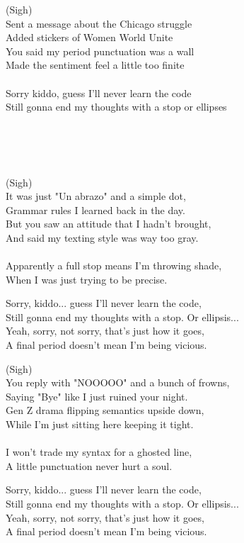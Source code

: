\begin{lyrics}


(Sigh)
\\
Sent a message about the Chicago struggle\\
Added stickers of Women World Unite\\
You said my period punctuation was a wall\\
Made the sentiment feel a little too finite\\
\\
Sorry kiddo, guess I'll never learn the code\\
Still gonna end my thoughts with a stop or ellipses

\\
\\
\\

(Sigh)
\\
It was just "Un abrazo" and a simple dot,\\
Grammar rules I learned back in the day.\\
But you saw an attitude that I hadn’t brought,\\
And said my texting style was way too gray.\\
\\
Apparently a full stop means I'm throwing shade,\\
When I was just trying to be precise.

Sorry, kiddo... %
guess I'll never learn the code,\\
Still gonna end my thoughts with a stop. %
Or ellipsis...\\
Yeah, sorry, not sorry, that's just how it goes,\\
A final period doesn't mean I'm being vicious.

(Sigh)
\\
You reply with "NOOOOO" and a bunch of frowns,\\
Saying "Bye" like I just ruined your night.\\
Gen Z drama flipping semantics upside down,\\
While I'm just sitting here keeping it tight.\\
\\
I won't trade my syntax for a ghosted line,\\
A little punctuation never hurt a soul.

Sorry, kiddo... %
guess I'll never learn the code,\\
Still gonna end my thoughts with a stop. %
Or ellipsis...\\
Yeah, sorry, not sorry, that's just how it goes,\\
A final period doesn't mean I'm being vicious.

\end{lyrics}

